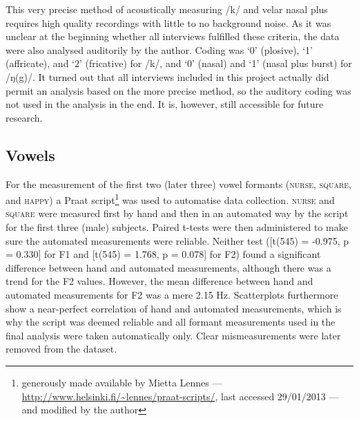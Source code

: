 This very precise method of acoustically measuring /k/ and velar nasal plus requires high quality recordings with little to no background noise.
As it was unclear at the beginning whether all interviews fulfilled these criteria, the data were also analysed auditorily by the author. 
Coding was `0' (plosive), `1' (affricate), and `2' (fricative) for /k/, and `0' (nasal) and `1' (nasal plus burst) for /ŋ(g)/.
It turned out that all interviews included in this project actually did permit an analysis based on the more precise \citeauthor{sangster2001} method, so the auditory coding was not used in the analysis in the end.
It is, however, still accessible for future research.

		\subsection{Vowels}\label{sec.prod_method.vow}
		
For the measurement of the first two (later three) vowel formants (\textsc{nurse}, \textsc{square}, and \textsc{happy}) a Praat script\footnote{generously made available by Mietta Lennes --- \url{http://www.helsinki.fi/~lennes/praat-scripts/}, last accessed 29/01/2013 --- and modified by the author} was used to automatise data collection.
\textsc{nurse} and \textsc{square} were measured first by hand and then in an automated way by the script for the first three (male) subjects.
Paired t-tests were then administered to make sure the automated measurements were reliable. Neither test ([t(545) = -0.975, p = 0.330] for F1 and [t(545) = 1.768, p = 0.078] for F2) found a significant difference between hand and automated measurements, although there was a trend for the F2 values.
However, the mean difference between hand and automated measurements for F2 was a mere 2.15 Hz.
Scatterplots furthermore show a near-perfect correlation of hand and automated measurements, which is why the script was deemed reliable and all formant measurements used in the final analysis were taken automatically only.
Clear mismeasurements were later removed from the dataset.

